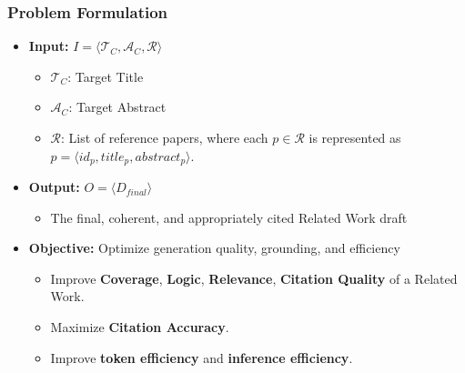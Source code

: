 \begin{frame}[t]
\vspace{-2mm}
\frametitle{Problem Formulation}

\begin{itemize}
    \item \textbf{Input:} $I = \langle \mathcal{T}_C, \mathcal{A}_C, \mathcal{R} \rangle$ 
    \begin{itemize}
        \item $\mathcal{T}_C$: Target Title
        \item $\mathcal{A}_C$: Target Abstract
        \item $\mathcal{R}$: List of reference papers, where each $p \in \mathcal{R}$ is represented as $p = \langle id_p, title_p, abstract_p \rangle$.
    \end{itemize}
    
    \vspace{0.5cm}
    
    \item \textbf{Output:} $O = \langle D_{final} \rangle$
    \begin{itemize}
        \item The final, coherent, and appropriately cited Related Work draft
    \end{itemize}
    
    \vspace{0.5cm}
    
    \item \textbf{Objective:} Optimize generation quality, grounding, and efficiency
    \begin{itemize}
        \item Improve \textbf{Coverage}, \textbf{Logic}, \textbf{Relevance}, \textbf{Citation Quality} of a Related Work.
        \item Maximize \textbf{Citation Accuracy}.
        \item Improve \textbf{token efficiency} and \textbf{inference efficiency}.
    \end{itemize}
\end{itemize}

\end{frame}